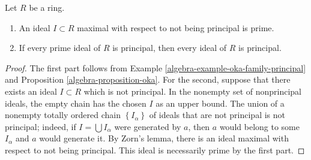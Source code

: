 \begin{lemma}
\label{editorial-source-lemma-primes-principal}
Let $R$ be a ring.
\begin{enumerate}
\item An ideal $I \subset R$ maximal with respect to not being
principal is prime.
\item If every prime ideal of $R$ is principal, then
every ideal of $R$ is principal.
\end{enumerate}
\end{lemma}

\begin{proof}
The first part follows from
Example \ref{algebra-example-oka-family-principal} and
Proposition \ref{algebra-proposition-oka}.
For the second, suppose that there exists an ideal $I \subset R$
which is not principal. In the nonempty set of nonprincipal ideals,
the empty chain has the chosen $I$ as an upper bound.
The union of a nonempty totally ordered chain
$\left\{I_\alpha\right\}$ of ideals that are not principal is not principal;
indeed, if $I = \bigcup I_\alpha$ were generated by
$a$, then $a$ would belong to some $I_\alpha $ and $a$ would generate it.
By Zorn's lemma, there is an ideal maximal with respect to not being
principal. This ideal is necessarily prime by the first part.
\end{proof}